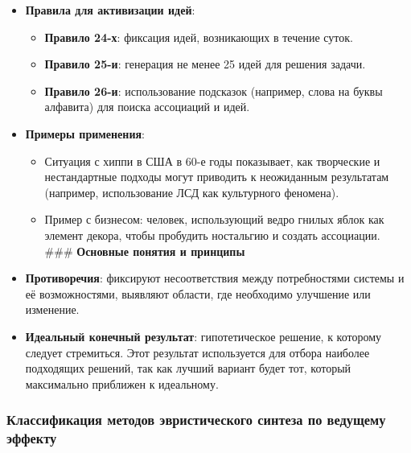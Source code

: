\documentclass[
]{article}
\providecommand{\tightlist}{%
  \setlength{\itemsep}{0pt}\setlength{\parskip}{0pt}}
\begin{document}
\begin{itemize}
\item
  \textbf{Правила для активизации идей}:

  \begin{itemize}
  \tightlist
  \item
    \textbf{Правило 24-х}: фиксация идей, возникающих в течение суток.
  \item
    \textbf{Правило 25-и}: генерация не менее 25 идей для решения
    задачи.
  \item
    \textbf{Правило 26-и}: использование подсказок (например, слова на
    буквы алфавита) для поиска ассоциаций и идей.
  \end{itemize}
\item
  \textbf{Примеры применения}:

  \begin{itemize}
  \tightlist
  \item
    Ситуация с хиппи в США в 60-е годы показывает, как творческие и
    нестандартные подходы могут приводить к неожиданным результатам
    (например, использование ЛСД как культурного феномена).
  \item
    Пример с бизнесом: человек, использующий ведро гнилых яблок как
    элемент декора, чтобы пробудить ностальгию и создать ассоциации.
    \#\#\# \textbf{Основные понятия и принципы}
  \end{itemize}
\item
  \textbf{Противоречия}: фиксируют несоответствия между потребностями
  системы и её возможностями, выявляют области, где необходимо улучшение
  или изменение.
\item
  \textbf{Идеальный конечный результат}: гипотетическое решение, к
  которому следует стремиться. Этот результат используется для отбора
  наиболее подходящих решений, так как лучший вариант будет тот, который
  максимально приближен к идеальному.
\end{itemize}

\subsubsection{\texorpdfstring{\textbf{Классификация методов
эвристического синтеза по ведущему
эффекту}}{Классификация методов эвристического синтеза по ведущему эффекту}}\label{ux43aux43bux430ux441ux441ux438ux444ux438ux43aux430ux446ux438ux44f-ux43cux435ux442ux43eux434ux43eux432-ux44dux432ux440ux438ux441ux442ux438ux447ux435ux441ux43aux43eux433ux43e-ux441ux438ux43dux442ux435ux437ux430-ux43fux43e-ux432ux435ux434ux443ux449ux435ux43cux443-ux44dux444ux444ux435ux43aux442ux443}
\end{document}
